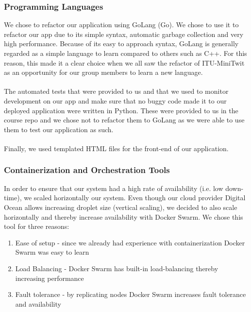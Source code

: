\documentclass{article}
\begin{document}
\subsubsection{Programming Languages}We chose to refactor our application using GoLang (Go). We chose to use it to refactor our app due to its simple syntax, automatic garbage collection and very high performance. Because of its easy to approach syntax, GoLang is generally regarded as a simple language to learn compared to others such as C++. For this reason, this made it a clear choice when we all saw the refactor of ITU-MiniTwit as an opportunity for our group members to learn a new language.
\\\\
The automated tests that were provided to us and that we used to monitor development on our app and make sure that no buggy code made it to our deployed application were written in Python. These were provided to us in the course repo and we chose not to refactor them to GoLang as we were able to use them to test our application as such.
\\\\
Finally, we used templated HTML files for the front-end of our application.

\subsubsection{Containerization and Orchestration Tools}
In order to ensure that our system had a high rate of availability (i.e. low down-time), we scaled horizontally our system. Even though our cloud provider Digital Ocean allows increasing droplet size (vertical scaling), we decided to also scale horizontally and thereby increase availability with Docker Swarm. We chose this tool for three reasons: 

\begin{enumerate}
    \item Ease of setup - since we already had experience with containerization Docker Swarm was easy to learn
    \item Load Balancing - Docker Swarm has built-in load-balancing thereby increasing performance
    \item Fault tolerance - by replicating nodes Docker Swarm increases fault tolerance and availability
\end{enumerate}
\end{document}

